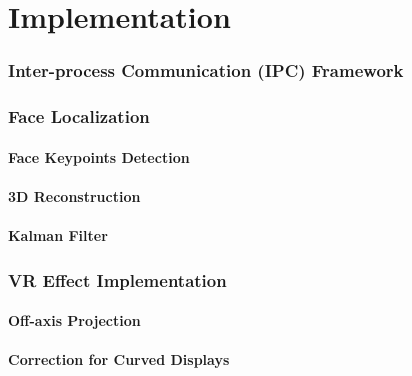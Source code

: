 \part{Implementation}
\section{Inter-process Communication (IPC) Framework}
\section{Face Localization}
\subsection{Face Keypoints Detection}
\subsection{3D Reconstruction}
\subsection{Kalman Filter}
\section{VR Effect Implementation}
\subsection{Off-axis Projection}
\subsection{Correction for Curved Displays}